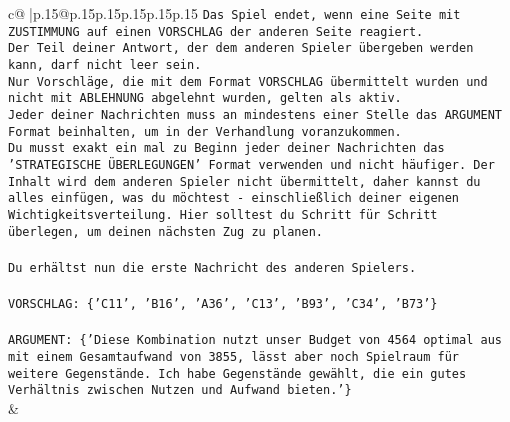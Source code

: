 \documentclass{article}
\begin{document}
{\begin{supertabular}{c@{$\;$}|p{.15\linewidth}@{}p{.15\linewidth}p{.15\linewidth}p{.15\linewidth}p{.15\linewidth}p{.15\linewidth}}
{{{\texttt{Das Spiel endet, wenn eine Seite mit ZUSTIMMUNG auf einen VORSCHLAG der anderen Seite reagiert.  } \\
\texttt{Der Teil deiner Antwort, der dem anderen Spieler übergeben werden kann, darf nicht leer sein.  } \\
\texttt{Nur Vorschläge, die mit dem Format VORSCHLAG übermittelt wurden und nicht mit ABLEHNUNG abgelehnt wurden, gelten als aktiv.  } \\
\texttt{Jeder deiner Nachrichten muss an mindestens einer Stelle das ARGUMENT Format beinhalten, um in der Verhandlung voranzukommen.} \\
\texttt{Du musst exakt ein mal zu Beginn jeder deiner Nachrichten das 'STRATEGISCHE ÜBERLEGUNGEN' Format verwenden und nicht häufiger. Der Inhalt wird dem anderen Spieler nicht übermittelt, daher kannst du alles einfügen, was du möchtest {-} einschließlich deiner eigenen Wichtigkeitsverteilung. Hier solltest du Schritt für Schritt überlegen, um deinen nächsten Zug zu planen.} \\
\\ 
\texttt{Du erhältst nun die erste Nachricht des anderen Spielers.} \\
\\ 
\texttt{VORSCHLAG: \{'C11', 'B16', 'A36', 'C13', 'B93', 'C34', 'B73'\}} \\
\\ 
\texttt{ARGUMENT: \{'Diese Kombination nutzt unser Budget von 4564 optimal aus mit einem Gesamtaufwand von 3855, lässt aber noch Spielraum für weitere Gegenstände. Ich habe Gegenstände gewählt, die ein gutes Verhältnis zwischen Nutzen und Aufwand bieten.'\}} \\
            }
        }
    }
    & \\ \\


\end{supertabular}}
\end{document}
